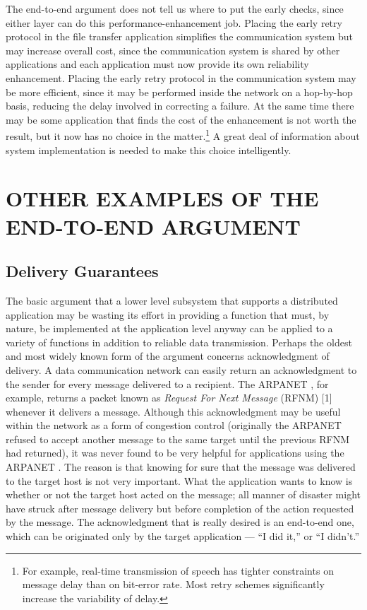 \documentclass[a4paper,12pt,notitlepage,twoside,openright]{article}
\begin{document}
The end-to-end argument does not tell us where to put the early checks,
since either layer can do this performance-enhancement job. Placing the
early retry protocol in the file transfer application simplifies the
communication system but may increase overall cost, since the
communication system is shared by other applications and each
application must now provide its own reliability enhancement. Placing
the early retry protocol in the communication system may be more
efficient, since it may be performed inside the network on a hop-by-hop
basis, reducing the delay involved in correcting a failure. At the same
time there may be some application that finds the cost of the
enhancement is not worth the result, but it now has no choice in the
matter.\footnote{For example, real-time transmission of speech has tighter constraints on message delay than on bit-error rate. Most retry schemes significantly increase the variability of delay.} A
great deal of information about system implementation is needed to make
this choice intelligently.


\hypertarget{other-examples-of-the-end-to-end-argument}{%
\section{OTHER EXAMPLES OF THE END-TO-END
ARGUMENT}\label{other-examples-of-the-end-to-end-argument}}

\hypertarget{delivery-guarantees}{%
\subsection{Delivery Guarantees}\label{delivery-guarantees}}


The basic argument that a lower level subsystem that supports a
distributed application may be wasting its effort in providing a
function that must, by nature, be implemented at the application level
anyway can be applied to a variety of functions in addition to reliable
data transmission. Perhaps the oldest and most widely known form of the
argument concerns acknowledgment of delivery. A data communication
network can easily return an acknowledgment to the sender for every
message delivered to a recipient. The ARPANET , for example,
returns a packet known as \emph{Request For Next Message} (RFNM) {[}1{]}
whenever it delivers a message. Although this acknowledgment may be
useful within the network as a form of congestion control (originally
the ARPANET refused to accept another message to the same target
until the previous RFNM had returned), it was never found to be very
helpful for applications using the ARPANET . The reason is that
knowing for sure that the message was delivered to the target host is
not very important. What the application wants to know is whether or
not the target host acted on the message; all manner of disaster might
have struck after message delivery but before completion of the action
requested by the message. The acknowledgment that is really desired is
an end-to-end one, which can be originated only by the target
application --- ``I did it,'' or ``I didn't.''
\end{document}
